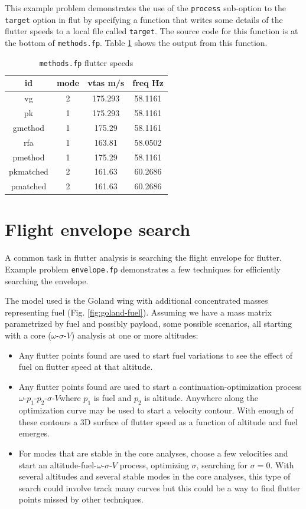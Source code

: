 \documentclass[10pt,openany,twoside]{book}
\numberwithin{equation}{section}   %
\newcommand{\Cmd}[1]{{\sf #1}}
\newcommand{\Code}[1]{{\small\tt #1}}
\newcommand{\Tableref}[1]{Table \ref{#1}}
\newcommand{\Figref}[1]{Fig. \ref{#1}}
\newcommand{\OSV}{$\omega$-$\sigma$-$V$\:}               %
\newcommand{\OPPSV}{$\omega$-$p_1$-$p_2$-$\sigma$-$V$\:}	%
\begin{document}
This example problem demonstrates the use of the \Code{process} sub-option
to the \Code{target} option in \Cmd{flut} by specifying a function that
writes some details of the flutter speeds to a local file called \Code{target}.
The source code for this function is at the bottom of \Code{methods.fp}.
\Tableref{table:methods-results} shows the output from this function.
\begin{table}[ht]  %
\centering
\begin{tabular}{|c|c|c|c|} \hline
{\bf id}  &  {\bf mode}      & {\bf vtas m/s}	& {\bf freq Hz}  \\ \hline
vg	&   2 & 175.293 & 58.1161 \\
pk &  1 & 175.293	&	58.1161	\\
gmethod &   1 & 175.29	&	 58.1161 \\
rfa &   1 & 163.81	&	 58.0502 \\
pmethod &   1 & 175.29	&	 58.1161 \\
pkmatched &   2 & 161.63	&	 60.2686 \\
pmatched &   2 & 161.63	&	 60.2686	\\ \hline
\end{tabular}
\caption{\Code{methods.fp} flutter speeds}\label{table:methods-results}
\end{table}

\section{Flight envelope search}\label{ex:envelope-search}
A common task in flutter analysis is searching the flight envelope
for flutter. Example problem \Code{envelope.fp} demonstrates a few
techniques for efficiently searching the envelope.

The model used is the Goland wing with additional concentrated masses
representing fuel (\Figref{fig:goland-fuel}).
Assuming we have a mass matrix parametrized by fuel and possibly payload,
some possible scenarios, all starting with a core (\OSV) analysis at one
or more altitudes:
\begin{itemize}
	\item Any flutter points found are used to start fuel variations
		to see the effect of fuel on flutter speed at that altitude.
	\item Any flutter points found are used to start a
		continuation-optimization process \OPPSV where $p_1$ is fuel and
		$p_2$ is altitude. Anywhere along the optimization
		curve may be used to start a velocity contour. With enough of these
		contours a 3D surface of flutter speed as a function of altitude and
		fuel emerges.
	\item For modes that are stable in the core analyses, choose a few
		velocities and start an altitude-fuel-$\omega$-$\sigma$-$V$\: process,
		optimizing $\sigma$, searching for $\sigma=0$. With several altitudes
		and several stable modes in the core analyses, this type of search
		could involve track many curves but this could be a way to find
		flutter points missed by other techniques.
\end{itemize}
\end{document}
